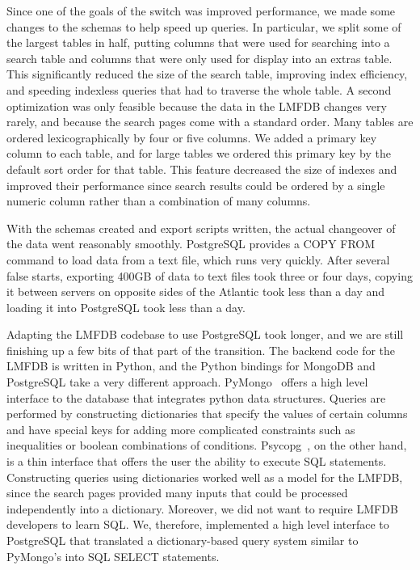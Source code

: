 \documentclass{amsart}
\begin{document}
Since one of the goals of the switch was improved performance, we made some changes to the schemas to help speed up queries.
In particular, we split some of the largest tables in half, putting columns that were used for searching into a search table and columns that were only used for display into an extras table.
This significantly reduced the size of the search table, improving index efficiency, and speeding indexless queries that had to traverse the whole table.
A second optimization was only feasible because the data in the LMFDB changes very rarely, and because the search pages come with a standard order.
Many tables are ordered lexicographically by four or five columns.
We added a primary key column to each table, and for large tables we ordered this primary key by the default sort order for that table.
This feature decreased the size of indexes and improved their performance since search results could be ordered by a single numeric column rather than a combination of many columns.

With the schemas created and export scripts written, the actual changeover of the data went reasonably smoothly.
PostgreSQL provides a COPY FROM command to load data from a text file, which runs very quickly.
After several false starts, exporting 400GB of data to text files took three or four days, copying it between servers on opposite sides of the Atlantic took less than a day and loading it into PostgreSQL took less than a day.

Adapting the LMFDB codebase to use PostgreSQL took longer, and we are still finishing up a few bits of that part of the transition.
The backend code for the LMFDB is written in Python, and the Python bindings for MongoDB and PostgreSQL take a very different approach.
PyMongo~\cite{pymongo} offers a high level interface to the database that integrates python data structures.
Queries are performed by constructing dictionaries that specify the values of certain columns and have special keys for adding more complicated constraints such as inequalities or boolean combinations of conditions.
Psycopg~\cite{psycopg}, on the other hand, is a thin interface that offers the user the ability to execute SQL statements.
Constructing queries using dictionaries worked well as a model for the LMFDB, since the search pages provided many inputs that could be processed independently into a dictionary.
Moreover, we did not want to require LMFDB developers to learn SQL.
We, therefore, implemented a high level interface to PostgreSQL that translated a dictionary-based query system similar to PyMongo's into SQL SELECT statements.
\end{document}
